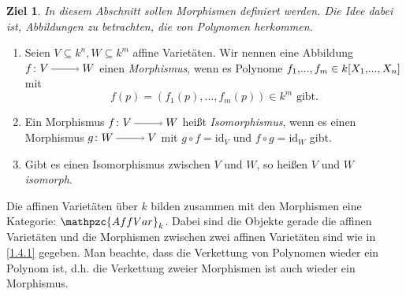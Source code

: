 \documentclass[a4paper,12pt,index=toc]{scrbook}
\theoremstyle{keinenummern} %
\newtheorem{ziel}{Ziel}
\newcommand{\AffVar}{\mathpzc{AffVar}}
\newcommand{\id}{\mathrm{id}}
\renewcommand{\dotsc}{\ensuremath{\!...}}
\newcommand{\polyx}[1][n]{\ensuremath%
  [X_{1},\dotsc,X_{#1}]}
\begin{document}
\begin{ziel}In diesem Abschnitt sollen Morphismen definiert werden. Die Idee dabei ist, Abbildungen zu betrachten, die von Polynomen herkommen.
\end{ziel}
\begin{dfn}\label{1.4.1}
\begin{enumerate}
\item{} Seien $V\subseteq k^{n}, W\subseteq k^{m}$ affine Varietäten. Wir nennen eine Abbildung $f\colon V\ra W$ einen \emph{Morphismus}, wenn es Polynome $f_1,\dotsc,f_m \in k\polyx$ mit 
\[f(p)=(f_1(p),\dotsc,f_m(p)) \in k^{m}\text{ gibt.}\]
\item{} Ein Morphismus $f\colon V\ra W$ heißt \emph{Isomorphismus}, wenn es einen Morphismus $g\colon W\ra V$ mit $g\circ f=\id_V$ und $f\circ g=\id_W$ gibt.
\item{} Gibt es einen Isomorphismus zwischen $V$ und $W$, so heißen $V$ und $W$ \emph{isomorph}.
\end{enumerate}
\end{dfn}
\begin{bem}\label{1.4.2} Die affinen Varietäten über $k$ bilden zusammen mit den Morphismen eine Kategorie: $\AffVar_k$.
Dabei sind die Objekte gerade die affinen Varietäten und die Morphismen zwischen zwei affinen Varietäten sind wie in \cref{1.4.1} gegeben. Man beachte, dass die Verkettung von Polynomen wieder ein Polynom ist, d.h. die Verkettung zweier Morphismen ist auch wieder ein Morphismus.
\end{bem}
\end{document}
